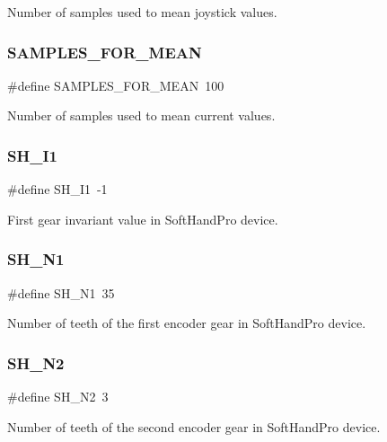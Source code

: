 Number of samples used to mean joystick values. \mbox{\label{globals_8h_a1f15a178b37117a29361e7ec20f77cc4}} 
\subsubsection{S\+A\+M\+P\+L\+E\+S\+\_\+\+F\+O\+R\+\_\+\+M\+E\+AN}
{\footnotesize\ttfamily \#define S\+A\+M\+P\+L\+E\+S\+\_\+\+F\+O\+R\+\_\+\+M\+E\+AN~100}

Number of samples used to mean current values. \mbox{\label{globals_8h_ac7c2aa0be1a1453f2a25e75f1c7bff16}} 
\subsubsection{S\+H\+\_\+\+I1}
{\footnotesize\ttfamily \#define S\+H\+\_\+\+I1~-\/1}

First gear invariant value in Soft\+Hand\+Pro device. \mbox{\label{globals_8h_af550b25a7e09356fe9fac2773725fa53}} 
\subsubsection{S\+H\+\_\+\+N1}
{\footnotesize\ttfamily \#define S\+H\+\_\+\+N1~35}

Number of teeth of the first encoder gear in Soft\+Hand\+Pro device. \mbox{\label{globals_8h_a20594cbd96a48f93b6b3e0bb8590d15e}} 
\subsubsection{S\+H\+\_\+\+N2}
{\footnotesize\ttfamily \#define S\+H\+\_\+\+N2~3}

Number of teeth of the second encoder gear in Soft\+Hand\+Pro device. \mbox{\label{globals_8h_a695dd637b37252af2a517ba8bae8d2c4}} 
